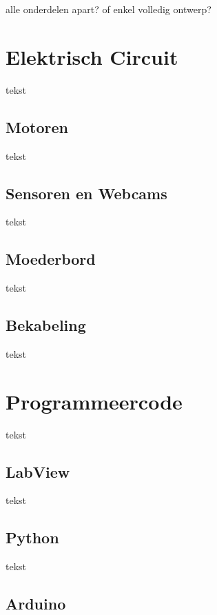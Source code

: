 \documentclass[kulak]{kulakarticle} %
\begin{document}
	alle onderdelen apart? of enkel volledig ontwerp?
	
	
	
	\section{Elektrisch Circuit}
	
	tekst
	
	
	\subsection{Motoren}
	
	tekst
	
	
	\subsection{Sensoren en Webcams}
	
	tekst
	
	
	\subsection{Moederbord}
	
	tekst
	
	
	\subsection{Bekabeling}
	
	tekst
	
	
	
	\section{Programmeercode}
	
	tekst
	
	
	\subsection{LabView}
	
	tekst
	
	
	\subsection{Python}
	
	tekst
	
	
	\subsection{Arduino}
	
\end{document}
